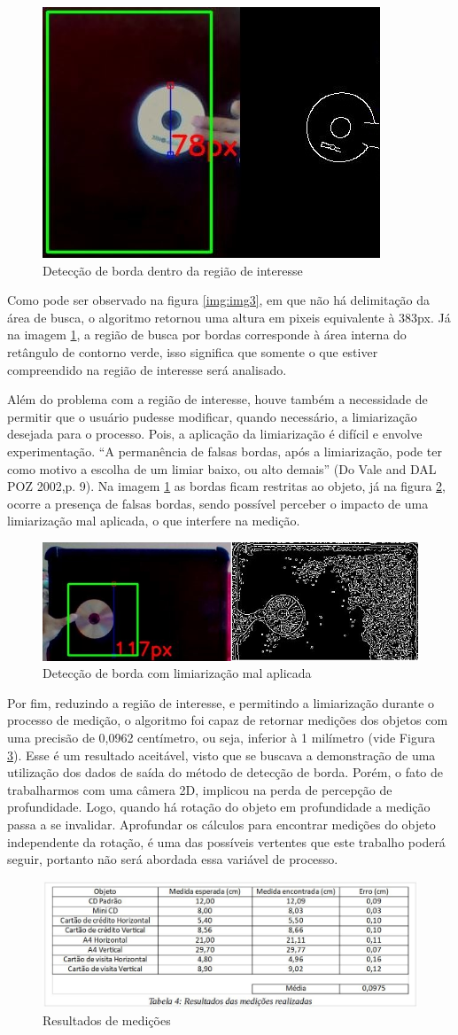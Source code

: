 \documentclass[a4paper,alpha-refs]{RBCA_v1.0}
\begin{document}
\begin{figure}[h!]
	\centering
	\includegraphics[width=.3\textwidth]{img/06-IMAGEM4.jpg}
	\caption{Detecção de borda dentro da região de interesse}
	\label{img:img4}
\end{figure}

Como pode ser observado na figura \ref{img:img3}, em que não há delimitação da área de busca, o algoritmo retornou uma altura em pixeis equivalente à 383px. Já na imagem \ref{img:img4}, a região de busca por bordas corresponde à área interna do retângulo de contorno verde, isso significa que somente o que estiver compreendido na região de interesse será analisado.

Além do problema com a região de interesse, houve também a necessidade de permitir que o usuário pudesse modificar, quando necessário, a limiarização desejada para o processo. Pois, a aplicação da limiarização é difícil e envolve experimentação. “A permanência de falsas bordas, após a limiarização, pode ter como motivo a escolha de um limiar baixo, ou alto demais” (Do Vale and DAL POZ 2002,p. 9). Na imagem \ref{img:img4} as bordas ficam restritas ao objeto, já na figura \ref{img:img5}, ocorre a presença de falsas bordas, sendo possível perceber o impacto de uma limiarização mal aplicada, o que interfere na medição.

\begin{figure}[h!]
	\centering
	\includegraphics[width=.5\textwidth]{img/07-IMAGEM5.jpg}
	\caption{Detecção de borda com limiarização mal aplicada}
	\label{img:img5}
\end{figure}

Por fim, reduzindo a região de interesse, e permitindo a limiarização durante o processo de medição, o algoritmo foi capaz de retornar medições dos objetos com uma precisão de 0,0962 centímetro, ou seja, inferior à 1 milímetro (vide Figura \ref{img:tabela3}). Esse é um resultado aceitável, visto que se buscava a demonstração de uma utilização dos dados de saída do método de detecção de borda. Porém, o fato de trabalharmos com uma câmera 2D, implicou na perda de percepção de profundidade. Logo, quando há rotação do objeto em profundidade a medição passa a se invalidar. Aprofundar os cálculos para encontrar medições do objeto independente da rotação, é uma das possíveis vertentes que este trabalho poderá seguir, portanto não será abordada essa variável de processo.

\begin{figure}[h!]
	\centering
	\includegraphics[width=.5\textwidth]{img/T4.JPG}
	\caption{Resultados de medições}
	\label{img:tabela3}
\end{figure}

 
\end{document}
